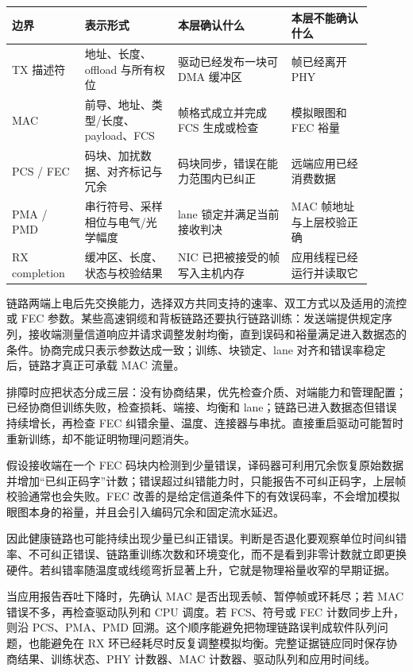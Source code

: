 \begin{longtable}{L{0.18\linewidth}L{0.23\linewidth}L{0.29\linewidth}L{0.20\linewidth}}
\toprule
边界 & 表示形式 & 本层确认什么 & 本层不能确认什么 \\
\midrule
TX 描述符 & 地址、长度、offload 与所有权位 & 驱动已经发布一块可 DMA 缓冲区 & 帧已经离开 PHY \\\tablerowrule
MAC & 前导、地址、类型/长度、payload、FCS & 帧格式成立并完成 FCS 生成或检查 & 模拟眼图和 FEC 裕量 \\\tablerowrule
PCS / FEC & 码块、加扰数据、对齐标记与冗余 & 码块同步，错误在能力范围内已纠正 & 远端应用已经消费数据 \\\tablerowrule
PMA / PMD & 串行符号、采样相位与电气/光学幅度 & lane 锁定并满足当前接收判决 & MAC 帧地址与上层校验正确 \\\tablerowrule
RX completion & 缓冲区、长度、状态与校验结果 & NIC 已把被接受的帧写入主机内存 & 应用线程已经运行并读取它 \\
\bottomrule
\end{longtable}

链路两端上电后先交换能力，选择双方共同支持的速率、双工方式以及适用的流控或 FEC 参数。某些高速铜缆和背板链路还要执行链路训练：发送端提供规定序列，接收端测量信道响应并请求调整发射均衡，直到误码和裕量满足进入数据态的条件。协商完成只表示参数达成一致；训练、块锁定、lane 对齐和错误率稳定后，链路才真正可承载 MAC 流量。

排障时应把状态分成三层：没有协商结果，优先检查介质、对端能力和管理配置；已经协商但训练失败，检查损耗、端接、均衡和 lane；链路已进入数据态但错误持续增长，再检查 FEC 纠错余量、温度、连接器与串扰。直接重启驱动可能暂时重新训练，却不能证明物理问题消失。

假设接收端在一个 FEC 码块内检测到少量错误，译码器可利用冗余恢复原始数据并增加“已纠正码字”计数；错误超过纠错能力时，只能报告不可纠正码字，上层帧校验通常也会失败。FEC 改善的是给定信道条件下的有效误码率，不会增加模拟眼图本身的裕量，并且会引入编码冗余和固定流水延迟。

因此健康链路也可能持续出现少量已纠正错误。判断是否退化要观察单位时间纠错率、不可纠正错误、链路重训练次数和环境变化，而不是看到非零计数就立即更换硬件。若纠错率随温度或线缆弯折显著上升，它就是物理裕量收窄的早期证据。

当应用报告吞吐下降时，先确认 MAC 是否出现丢帧、暂停帧或环耗尽；若 MAC 错误不多，再检查驱动队列和 CPU 调度。若 FCS、符号或 FEC 计数同步上升，则沿 PCS、PMA、PMD 回溯。这个顺序能避免把物理链路误判成软件队列问题，也能避免在 RX 环已经耗尽时反复调整模拟均衡。完整证据链应同时保存协商结果、训练状态、PHY 计数器、MAC 计数器、驱动队列和应用时间线。

